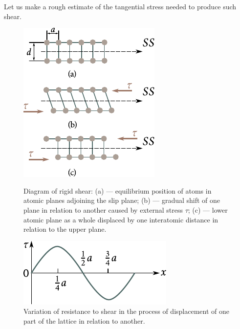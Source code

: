 Let us make a rough estimate of the tangential stress needed to produce such shear.

\begin{figure}[t]
	\begin{minipage}[t]{0.52\linewidth}
		\begin{center}
			\includegraphics[scale=1]{figures/ch_02/fig_2_7.pdf}
			\caption[]{Diagram of rigid shear: (a) --- equilibrium position of atoms in atomic planes adjoining the slip plane; (b) --- gradual shift of one plane in relation to another caused by external stress $\tau$; (c) --- lower atomic plane as a whole displaced by one interatomic distance in relation to the upper plane.}
			\label{fig:2_7}
		\end{center}
	\end{minipage}
	\hfill{ }%
	\begin{minipage}[t]{0.43\linewidth}
		\begin{center}
			\includegraphics[scale=1]{figures/ch_02/fig_2_8.pdf}
			\caption[]{Variation of resistance to shear in the process of displacement of one part of the lattice in relation to another.}
			\label{fig:2_8}
		\end{center}
	\end{minipage}
\vspace{-0.3cm}
\end{figure}

